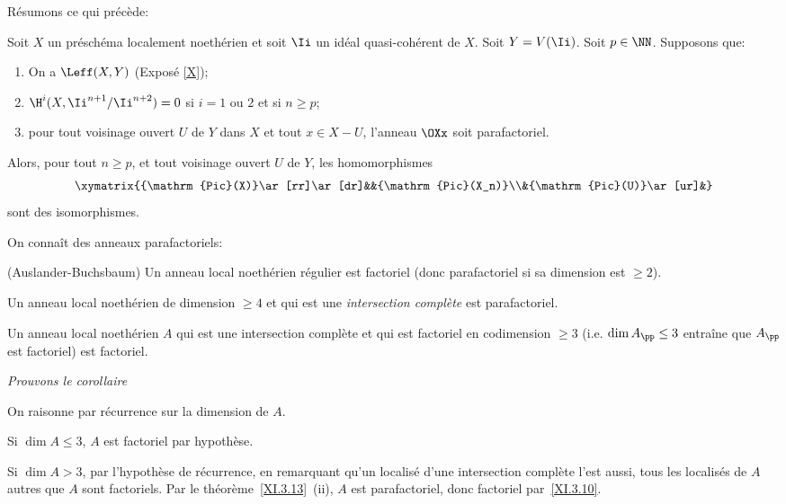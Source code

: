 \smallskip
R\'esumons ce qui pr\'ec\`ede:

\begin{proposition} \label{XI.3.12}
Soit $X$ un pr\'esch\'ema localement noeth\'erien et soit $\Ii$ un id\'eal quasi-coh\'erent de $X$. Soit $Y=V(\Ii)$. Soit $p\in\NN$. Supposons que:
\begin{enumerate}
\item[1)] On a $\Leff(X, Y)$ (\textup{Exposé} \ref{X});
\item[2)] $\H^i(X, \Ii^{n+1}/\Ii^{n+2})=0$ si $i=1$ ou $2$ et si $n\geq p$;
\item[3)] pour tout voisinage ouvert $U$ de $Y$ dans $X$ et tout $x\in X-U$, l'anneau $\OXx$ soit parafactoriel.
\end{enumerate}
\noindent
Alors, pour tout $n\geq p$, et tout voisinage ouvert $U$ de $Y$, les homomorphismes
\[
\xymatrix{{\mathrm{Pic}(X)}\ar[rr]\ar[dr]&&{\mathrm{Pic}(X_n)}\\&{\mathrm{Pic}(U)}\ar[ur]&}
\]
sont des isomorphismes.
\end{proposition}

On conna\^it des anneaux parafactoriels:

\skpt
\begin{theoreme} \label{XI.3.13}
\begin{enumeratei}
\item
(Auslander-Buchsbaum) Un anneau local noeth\'erien r\'egulier est factoriel (donc parafactoriel si sa dimension est $\geq 2$).
\item
Un anneau local noeth\'erien de dimension $\geq 4$ et qui est une \emph{intersection complète} est parafactoriel.
\end{enumeratei}
\end{theoreme}

\begin{corollaire} Un anneau local noeth\'erien $A$ qui est une intersection compl\`ete et qui est factoriel en codimension $\geq 3$ (i.e. $\dim A_{{\pp}}\leq 3$ entra\^ine que $A_{{\pp}}$ est factoriel) est factoriel.
\end{corollaire}

\emph{Prouvons le corollaire}

On raisonne par r\'ecurrence sur la dimension de $A$.

Si $\dim A\leq 3$, $A$ est factoriel par hypoth\`ese.

Si $\dim A>3$, par l'hypoth\`ese de r\'ecurrence, en remarquant qu'un localis\'e d'une intersection compl\`ete l'est aussi, tous les localis\'es de $A$ autres que $A$ sont factoriels. Par le th\'eor\`eme~\ref{XI.3.13}~(ii), $A$ est parafactoriel, donc factoriel par~\ref{XI.3.10}.

